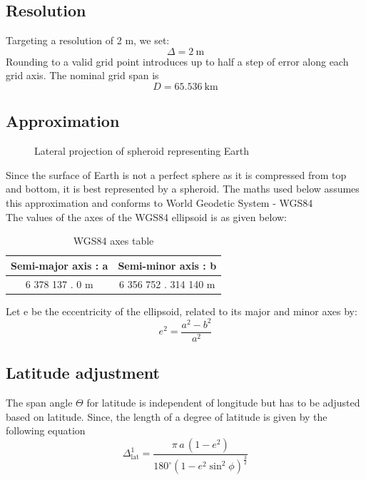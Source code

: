 \documentclass[conference]{IEEEtran}
\begin{document}
\subsection{Resolution}
Targeting a resolution of 2 m, we set:
\begin{equation}
\Delta = 2\ \mathrm{m}
\end{equation}
Rounding to a valid grid point introduces up to half a step of error along each grid axis. The nominal grid span is
\begin{equation}
D = 65.536\ \mathrm{km}
\end{equation}


\subsection{Approximation}
\begin{figure}[htbp]
\centerline{}
\caption{Lateral projection of spheroid representing Earth}
\label{Spheroid}
\end{figure}
Since the surface of Earth is not a perfect sphere as it is compressed from top and bottom, it is best represented by a spheroid.
The maths used below assumes this approximation and conforms to World Geodetic System - WGS84\cite{b1}\\
The values of the axes of the WGS84 ellipsoid is as given below:
\begin{table}[h!]
\caption{WGS84 axes table}
\begin{center}
\bgroup
\def\arraystretch{1.4}%
\begin{tabular}{c|c}
\textbf{Semi-major axis : a} & \textbf{Semi-minor axis : b} \\
\hline
6 378 137 . 0 m & 6 356 752 . 314 140 m\\
\end{tabular}
\egroup
\end{center} \end{table}

Let e be the eccentricity of the ellipsoid, related to its major and minor axes by:
\begin{equation}
e^2 = \frac{a^2-b^2}{a^2}
\end{equation}

\subsection{Latitude adjustment}
The span angle $\Theta$ for latitude is independent of longitude but has to be adjusted based on latitude.
Since, the length of a degree of latitude is given by the following equation\cite{b2}
\begin{equation}
\Delta_{\mathrm{lat}}^1 = \frac{\pi\,a\,(1-e^2)}{180^\circ (1-e^2 \sin^2\phi)^{\frac{3}{2}}}
\end{equation}
\end{document}
